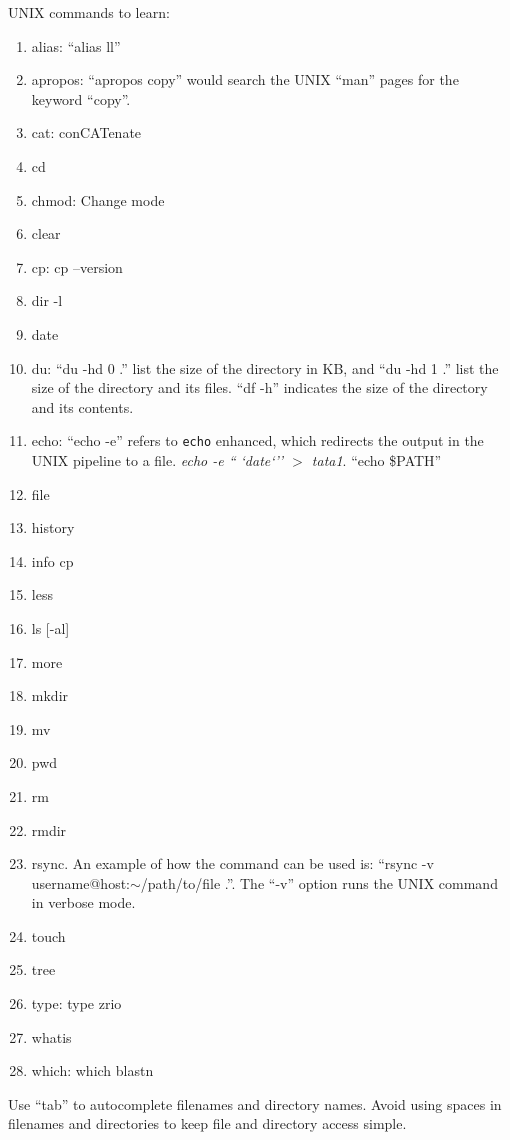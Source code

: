 UNIX commands to learn: \vspace{-0.3cm}
\begin{enumerate}	\itemsep -4pt
	\item alias: ``alias ll''
	\item apropos: ``apropos copy'' would search the UNIX ``man'' pages for the keyword ``copy''.
	\item cat: conCATenate
	\item cd
	\item chmod: Change mode
	\item clear
	\item cp: cp --version
	\item dir -l
	\item date
	\item du: ``du -hd 0 .'' list the size of the directory in KB, and ``du -hd 1 .'' list the size of the directory and its files. ``df -h'' indicates the size of the directory and its contents. 
	\item echo: ``echo -e'' refers to {\tt echo} enhanced, which redirects the output in the UNIX pipeline to a file. {\it echo -e `` `date`'' $>$ tata1}. ``echo \$PATH''
	\item file
	\item history
	\item info cp
	\item less
	\item ls [-al]
	\item more
	\item mkdir
	\item mv
	\item pwd
	\item rm
	\item rmdir
	\item rsync. An example of how the command can be used is: ``rsync -v username@host:$\sim$/path/to/file .''. The ``-v'' option runs the UNIX command in verbose mode.
	\item touch
	\item tree
	\item type: type zrio
	\item whatis
	\item which: which blastn
\end{enumerate}


Use ``tab'' to autocomplete filenames and directory names. Avoid using spaces in filenames and directories to keep file and directory access simple. \\

